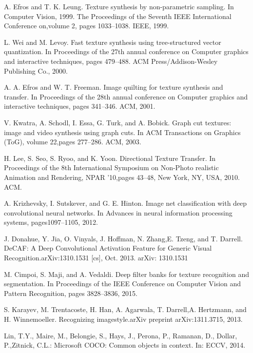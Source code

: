 \begin{thebibliography}{9}
A. Efros and T. K. Leung.  Texture synthesis by non-parametric sampling. In Computer Vision, 1999. The Proceedings of the Seventh IEEE International Conference on,volume 2, pages 1033–1038. IEEE, 1999.

L. Wei and M. Levoy.  Fast texture synthesis using tree-structured vector quantization. In Proceedings of the 27th annual conference on Computer graphics and interactive techniques, pages 479–488. ACM Press/Addison-Wesley Publishing Co., 2000.

A. A. Efros and W. T. Freeman.  Image quilting for texture synthesis and transfer. In Proceedings of the 28th annual conference on Computer graphics and interactive techniques, pages 341–346. ACM, 2001.

V. Kwatra, A. Schodl, I. Essa, G. Turk, and A. Bobick. Graph cut textures: image and video synthesis using graph cuts. In ACM Transactions on Graphics (ToG), volume 22,pages 277–286. ACM, 2003.

H. Lee, S. Seo, S. Ryoo, and K. Yoon. Directional Texture Transfer. In Proceedings of the 8th International Symposium on Non-Photo realistic Animation and Rendering, NPAR ’10,pages 43–48, New York, NY, USA, 2010. ACM.

A. Krizhevsky, I. Sutskever, and G. E. Hinton.  Image net classification with deep convolutional neural networks. In Advances in neural information processing systems, pages1097–1105, 2012.

J. Donahue, Y. Jia, O. Vinyals, J. Hoffman, N. Zhang,E. Tzeng, and T. Darrell.   DeCAF: A Deep Convolutional Activation Feature for Generic Visual Recognition.arXiv:1310.1531 [cs], Oct. 2013. arXiv: 1310.1531

M. Cimpoi, S. Maji, and A. Vedaldi. Deep filter banks for texture recognition and segmentation. In Proceedings of the IEEE Conference on Computer Vision and Pattern Recognition, pages 3828–3836, 2015.

S. Karayev, M. Trentacoste, H. Han, A. Agarwala, T. Darrell,A. Hertzmann, and H. Winnemoeller.  Recognizing imagestyle.arXiv preprint arXiv:1311.3715, 2013.

Lin, T.Y., Maire, M., Belongie, S., Hays, J., Perona, P., Ramanan, D., Dollar, P.,Zitnick, C.L.:  Microsoft COCO: Common objects in context.  In: ECCV, 2014. 


\end{thebibliography}
